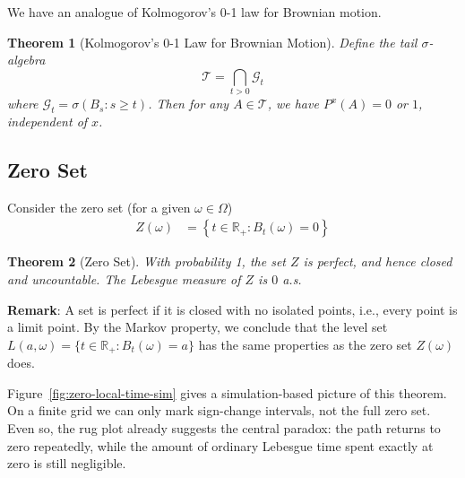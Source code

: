 \documentclass{article}
\theoremstyle{plain}
\newtheorem{theorem}{Theorem}
\theoremstyle{definition}
\begin{document}
    We have an analogue of Kolmogorov's 0-1 law for Brownian motion.
    \begin{theorem}[Kolmogorov's 0-1 Law for Brownian Motion] Define the tail $\sigma$-algebra
    $$\mathcal{T}=\bigcap_{t>0}\mathcal{G}_t$$
    where $\mathcal{G}_t=\sigma(B_s:s\ge t)$.
        Then for any $A\in\mathcal{T}$, we have $P^x(A)=0$ or $1$, independent of $x$.
    \end{theorem}

\subsection{Zero Set}

Consider the zero set (for a given $\omega\in\Omega$)
\begin{align}
    Z(\omega) &= \left\{t\in\mathbb{R}_+ : B_t(\omega)=0\right\}
\end{align}

\begin{theorem}[Zero Set]
With probability 1, the set $Z$ is perfect, and hence closed and uncountable. The Lebesgue measure of $Z$ is $0$ a.s.
\end{theorem}

\textbf{Remark}: A set is perfect if it is closed with no isolated points, i.e., every point is a limit point. By the Markov property, we conclude that the level set $L(a,\omega)=\{t\in\mathbb{R}_+ : B_t(\omega)=a\}$ has the same properties as the zero set $Z(\omega)$ does.

Figure~\ref{fig:zero-local-time-sim} gives a simulation-based picture of
this theorem. On a finite grid we can only mark sign-change intervals, not
the full zero set. Even so, the rug plot already suggests the central
paradox: the path returns to zero repeatedly, while the amount of ordinary
Lebesgue time spent exactly at zero is still negligible.
\end{document}
